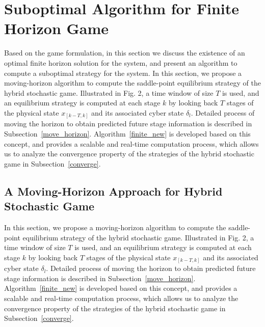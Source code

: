 \section{Suboptimal Algorithm for Finite Horizon Game}
\label{sec:algorithm_finite}

Based on the game formulation, in this section we discuss the existence of an optimal finite horizon solution for the system, and present an algorithm to compute a suboptimal strategy for the system. 
In this section, we propose a moving-horizon algorithm to compute the saddle-point equilibrium strategy of the hybrid stochastic game.  Illustrated in Fig. 2, a time window of size $T$ is used, and an equilibrium strategy is computed at each stage $k$ by looking back $T$ stages of the physical state $x_{[k-T, k]}$ and its associated cyber state $\delta_l$. Detailed process of moving the horizon to obtain predicted future stage information is described in Subsection~\ref{move_horizon}.  Algorithm~\ref{finite_new} is developed based on this concept, and provides a scalable and real-time computation process, which allows us to analyze the convergence property of the strategies of the hybrid stochastic game in Subsection~\ref{converge}. 

\subsection{A Moving-Horizon Approach for Hybrid Stochastic Game}
\label{sec:algorithm}
In this section, we propose a moving-horizon algorithm to compute the saddle-point equilibrium strategy of the hybrid stochastic game.  Illustrated in Fig. 2, a time window of size $T$ is used, and an equilibrium strategy is computed at each stage $k$ by looking back $T$ stages of the physical state $x_{[k-T, k]}$ and its associated cyber state $\delta_l$. Detailed process of moving the horizon to obtain predicted future stage information is described in Subsection~\ref{move_horizon}.  Algorithm~\ref{finite_new} is developed based on this concept, and provides a scalable and real-time computation process, which allows us to analyze the convergence property of the strategies of the hybrid stochastic game in Subsection~\ref{converge}. 
